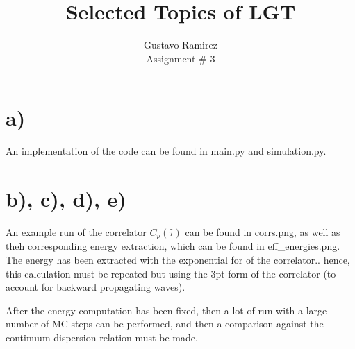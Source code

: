 \documentclass[11pt]{article}
\title{\textbf{Selected Topics of LGT}}
\author{Gustavo Ramirez\\
		Assignment \# 3}
\date{}
\begin{document}
\maketitle

\section{a)}

An implementation of the code can be found in main.py and simulation.py.


\section{b), c), d), e)}

An example run of the correlator $C_{p}(\hat{\tau})$ can be found in corrs.png, as well as theh corresponding energy extraction, which can be found in eff\_energies.png. The energy has been extracted with the exponential for of the correlator.. hence, this calculation must be repeated but using the 3pt form of the correlator (to account for backward propagating waves).

After the energy computation has been fixed, then a lot of run with a large number of MC steps can be performed, and then a comparison against the continuum dispersion relation must be made.
\end{document}
